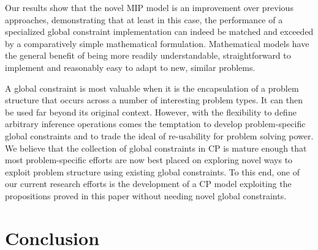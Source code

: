 \documentclass[oribibl]{llncs}
\begin{document}
Our results show that the novel MIP model is an improvement over
previous approaches, demonstrating that at least in this case, the
performance of a specialized global constraint implementation can
indeed be matched and exceeded by a comparatively simple mathematical
formulation. Mathematical models have the general benefit of being more readily
understandable, straightforward to implement and reasonably easy to
adapt to new, similar problems.

A global constraint is most valuable when it is the encapsulation of a
problem structure that occurs across a number of interesting problem
types. It can then be used far beyond its original context. However,
with the flexibility to define arbitrary inference operations comes the
temptation to develop problem-specific global constraints and to
trade the ideal of re-usability for problem solving power. We believe
that the collection of global constraints in CP is mature enough that
most problem-specific efforts are now best placed on exploring novel ways
to exploit problem structure using existing global constraints. To this
end, one of our current research efforts is the development of a CP
model exploiting the propositions proved in this paper without needing novel global constraints.

\section{Conclusion} \label{sec:conclusion}
\end{document}
